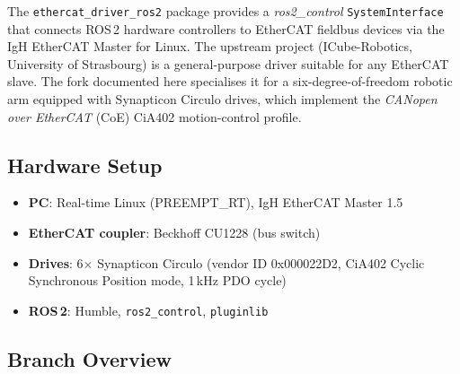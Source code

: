 \documentclass[11pt,a4paper]{article}
\begin{document}
The \texttt{ethercat\_driver\_ros2} package provides a \emph{ros2\_control}
\texttt{SystemInterface} that connects ROS\,2 hardware controllers to EtherCAT
fieldbus devices via the IgH EtherCAT Master for Linux.  The upstream project
(ICube-Robotics, University of Strasbourg) is a general-purpose driver
suitable for any EtherCAT slave.  The fork documented here specialises it for
a six-degree-of-freedom robotic arm equipped with Synapticon Circulo drives,
which implement the \emph{CANopen over EtherCAT} (CoE) CiA402 motion-control
profile.

\subsection{Hardware Setup}

\begin{itemize}[nosep]
  \item \textbf{PC}: Real-time Linux (PREEMPT\_RT), IgH EtherCAT Master 1.5
  \item \textbf{EtherCAT coupler}: Beckhoff CU1228 (bus switch)
  \item \textbf{Drives}: 6$\times$ Synapticon Circulo (vendor ID 0x000022D2,
        CiA402 Cyclic Synchronous Position mode, 1\,kHz PDO cycle)
  \item \textbf{ROS\,2}: Humble, \texttt{ros2\_control}, \texttt{pluginlib}
\end{itemize}

\subsection{Branch Overview}

\begin{center}
\end{center}
\end{document}
